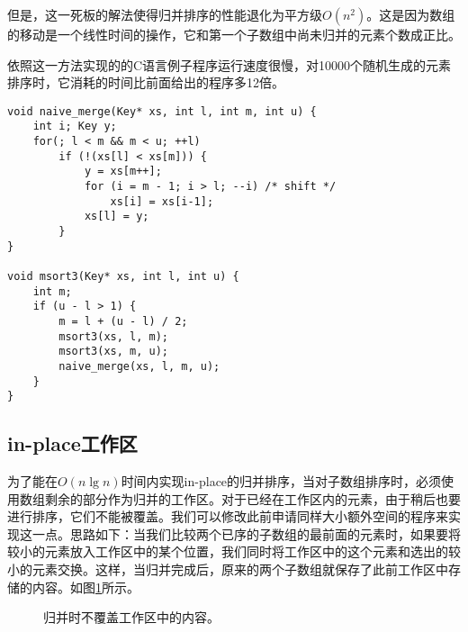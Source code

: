 \documentclass[UTF8]{article}
\begin{document}
但是，这一死板的解法使得归并排序的性能退化为平方级$O(n^2)$。这是因为数组的移动是一个线性时间的操作，它和第一个子数组中尚未归并的元素个数成正比。

依照这一方法实现的的C语言例子程序运行速度很慢，对10000个随机生成的元素排序时，它消耗的时间比前面给出的程序多12倍。

\lstset{language=C}
\begin{lstlisting}
void naive_merge(Key* xs, int l, int m, int u) {
    int i; Key y;
    for(; l < m && m < u; ++l)
        if (!(xs[l] < xs[m])) {
            y = xs[m++];
            for (i = m - 1; i > l; --i) /* shift */
                xs[i] = xs[i-1];
            xs[l] = y;
        }
}

void msort3(Key* xs, int l, int u) {
    int m;
    if (u - l > 1) {
        m = l + (u - l) / 2;
        msort3(xs, l, m);
        msort3(xs, m, u);
        naive_merge(xs, l, m, u);
    }
}
\end{lstlisting}

\subsection{in-place工作区}

为了能在$O(n \lg n)$时间内实现in-place的归并排序，当对子数组排序时，必须使用数组剩余的部分作为归并的工作区。对于已经在工作区内的元素，由于稍后也要进行排序，它们不能被覆盖。我们可以修改此前申请同样大小额外空间的程序来实现这一点。思路如下：当我们比较两个已序的子数组的最前面的元素时，如果要将较小的元素放入工作区中的某个位置，我们同时将工作区中的这个元素和选出的较小的元素交换。这样，当归并完成后，原来的两个子数组就保存了此前工作区中存储的内容。如图\ref{fig:merge-workarea}所示。

\begin{figure}[htbp]
 \centering
 \caption{归并时不覆盖工作区中的内容。}
 \label{fig:merge-workarea}
\end{figure}
\end{document}
